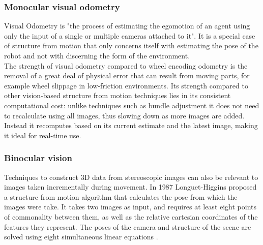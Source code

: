 \documentclass{article}
\begin{document}
		\subsubsection{Monocular visual odometry}
		Visual Odometry is "the process of estimating
the egomotion of an agent using only the input of a single or
multiple cameras attached to it"\cite{scaramuzza2011visual}. It is a special case of structure from motion that only concerns itself with estimating the pose of the robot and not with discerning the form of the environment. 
		\\The strength of visual odometry compared to wheel encoding odometry is the removal of a great deal of physical error that can result from moving parts, for example wheel slippage in low-friction environments. Its strength compared to other vision-based structure from motion techniques lies in its consistent computational cost: unlike techniques such as bundle adjustment it does not need to recalculate using all images, thus slowing down as more images are added. Instead it recomputes based on its current estimate and the latest image, making it ideal for real-time use\cite{scaramuzza2011visual}.
		
		\subsubsection{Binocular vision}
		Techniques to construct 3D data from stereoscopic images can also be relevant to images taken incrementally during movement. In 1987 Longuet-Higgins proposed a structure from motion algorithm that calculates the pose from which the images were take. It takes two images as input, and requires at least eight points of commonality between them, as well as the relative cartesian coordinates of the features they represent. The poses of the camera and structure of the scene are solved using eight simultaneous linear equations \cite{longuet1987computer}.
		
		

\renewcommand{\refname}{References}


\end{document}
